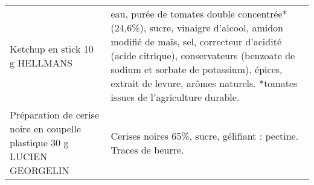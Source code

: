 \begin{longtable}{p{5cm}p{10cm}}
                                                                           Ketchup en stick 10 g HELLMANS &                                                                                                                                                                                                                                                                                                                                                                                                                                                                                                                                                                                                                                                                                                                                       eau, purée de tomates double concentrée* (24,6\%), sucre, vinaigre d'alcool, amidon modifié de maïs, sel, correcteur d'acidité (acide citrique), conservateurs (benzoate de sodium et sorbate de potassium), épices, extrait de levure, arômes naturels.  *tomates issues de l'agriculture durable. \\
                                  Préparation de cerise noire en coupelle plastique 30 g LUCIEN GEORGELIN &                                                                                                                                                                                                                                                                                                                                                                                                                                                                                                                                                                                                                                                                                                                                                                                                                                                                                                                                                                        Cerises noires 65\%, sucre, gélifiant : pectine. Traces de beurre. \\

\end{longtable}
